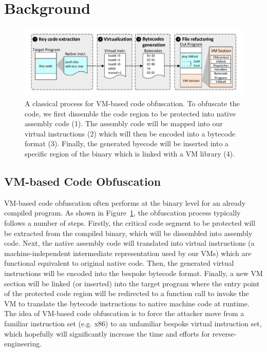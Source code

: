 \section{Background}\label{sec:bak}

\begin{figure}[t]%
    \centering
    \includegraphics[width=1\columnwidth]{figure/figvmp.pdf}
    \caption{A classical process for VM-based code obfuscation. 
    To obfuscate the code, we first dissemble the code region to be protected into native assembly code (1). The assembly code will be mapped
    into our virtual instructions (2) which will then be encoded into a bytecode format (3). Finally, the generated byecode will be inserted into a specific region of the binary which is linked with a VM library (4).
    }\label{fig:Fig.vmp}
\end{figure}

\subsection{VM-based Code Obfuscation}
VM-based code obfuscation often performs at the binary level for an already
compiled program. As shown in Figure~\ref{fig:Fig.vmp}, the obfuscation
process typically follows a number of steps. Firstly, the critical code
segment to be protected will be extracted from the compiled binary, which
will be dissembled into assembly code. Next, the native assembly code will
translated into virtual instructions (a machine-independent intermediate
representation used by our VMs) which are functional equivalent to original native code.
Then, the generated virtual instructions will be encoded into the bespoke
bytecode format.  Finally, a new VM section will be linked (or inserted) into
the target program where the entry point of the protected code region will be
redirected to a function call to invoke the VM to translate the bytecode
instructions to native machine code at runtime. The idea of VM-based code
obfuscation is to force the attacker move from a familiar
instruction set (e.g. x86) to an unfamiliar bespoke virtual instruction set,
which hopefully will significantly increase the time and efforts for 
reverse-engineering. 



